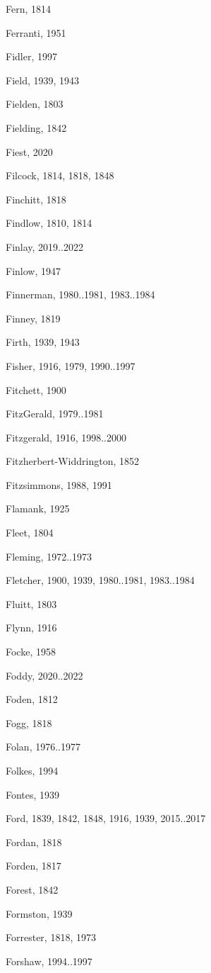 \begin{theindex}
\item Fern, 1814
\item Ferranti, 1951
\item Fidler, 1997
\item Field, 1939, 1943
\item Fielden, 1803
\item Fielding, 1842
\item Fiest, 2020
\item Filcock, 1814, 1818, 1848
\item Finchitt, 1818
\item Findlow, 1810, 1814
\item Finlay, 2019..2022
\item Finlow, 1947
\item Finnerman, 1980..1981, 1983..1984
\item Finney, 1819
\item Firth, 1939, 1943
\item Fisher, 1916, 1979, 1990..1997
\item Fitchett, 1900
\item FitzGerald, 1979..1981
\item Fitzgerald, 1916, 1998..2000
\item Fitzherbert-Widdrington, 1852
\item Fitzsimmons, 1988, 1991
\item Flamank, 1925
\item Fleet, 1804
\item Fleming, 1972..1973
\item Fletcher, 1900, 1939, 1980..1981, 1983..1984
\item Fluitt, 1803
\item Flynn, 1916
\item Focke, 1958
\item Foddy, 2020..2022
\item Foden, 1812
\item Fogg, 1818
\item Folan, 1976..1977
\item Folkes, 1994
\item Fontes, 1939
\item Ford, 1839, 1842, 1848, 1916, 1939, 2015..2017
\item Fordan, 1818
\item Forden, 1817
\item Forest, 1842
\item Formston, 1939
\item Forrester, 1818, 1973
\item Forshaw, 1994..1997

\end{theindex}
